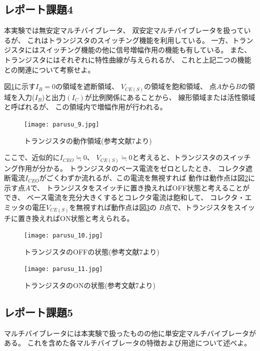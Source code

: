 \documentclass[12pt]{jarticle}
\begin{document}
\subsection{レポート課題4}
\begin{shadebox}
    本実験では無安定マルチバイブレータ、
    双安定マルチバイブレータを扱っているが、
    これはトランジスタのスイッチング機能を利用している。
    一方、トランジスタにはスイッチング機能の他に信号増幅作用の機能も有している。
    また、トランジスタにはそれぞれに特性曲線が与えられるが、
    これと上記二つの機能との関連について考察せよ。
\end{shadebox}
図\ref{fig9}に示す$I_B=0$の領域を遮断領域、
$V_{CE(S)}$の領域を飽和領域、
点$A$から$B$の領域を入力($I_B$)と出力$(I_C)$が比例関係にあることから、
線形領域または活性領域と呼ばれるが、
この領域内で増幅作用が行われる。
\begin{figure}[h]
    \begin{center}
        \texttt{[image: parusu\_9.jpg]}
    \end{center}
    \caption{トランジスタの動作領域(参考文献7より)}
    \label{fig9}
\end{figure}

ここで、近似的に$I_{CEO} \fallingdotseq 0$、
$V_{CE(S)} \fallingdotseq 0$と考えると、トランジスタのスイッチング作用が分かる。
トランジスタのベース電流をゼロとしたとき、
コレクタ遮断電流$I_{CEO}$がごくわずか流れるが、この電流を無視すれば
動作は動作点は図\ref{fig10}に示す点$A$で、
トランジスタをスイッチに置き換えればOFF状態と考えることができ、
ベース電流を充分大きくするとコレクタ電流は飽和して、
コレクタ・エミッタの電圧$V_{CE(S)}$を無視すれば動作点は図\ref{fig11}の
$B$点で、トランジスタをスイッチに置き換えればON状態と考えられる。

\begin{figure}[h]
    \begin{center}
        \texttt{[image: parusu\_10.jpg]}
    \end{center}
    \caption{トランジスタのOFFの状態(参考文献7より)}
    \label{fig10}
\end{figure}
\begin{figure}[h]
    \begin{center}
        \texttt{[image: parusu\_11.jpg]}
    \end{center}
    \caption{トランジスタのONの状態(参考文献7より)}
    \label{fig11}
\end{figure}

\clearpage
\subsection{レポート課題5}
\begin{shadebox}
    マルチバイブレータには本実験で扱ったものの他に単安定マルチバイブレータがある。
    これを含めた各マルチバイブレータの特徴および用途について述べよ。
\end{shadebox}
\end{document}
